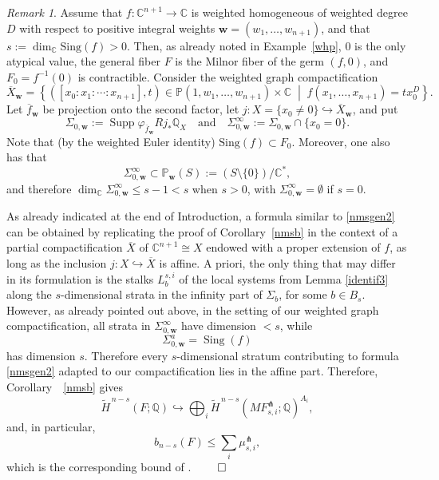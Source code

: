 \documentclass[12pt,leqno,twoside]{amsart}
\theoremstyle{remark}
\newtheorem{remark}[theorem]{\sc Remark}
\theoremstyle{remark}
\theoremstyle{definition}
\theoremstyle{remark}
\theoremstyle{remark}
\theoremstyle{remark}
\numberwithin{equation}{section}  %
\def\br{\begin{remark}}
\def\er{\end{remark}}
\newcommand{\bC}{\mathbb{C}}
\newcommand{\oX}{\overline{X}}
\newcommand{\Sing}{\mathrm{Sing}}
\begin{document}
\br\label{whp3}
Assume that $f\colon\bC^{n+1}\to \bC$ is weighted homogeneous of weighted degree $D$ with respect to positive integral weights $\mathbf w=(w_1,\ldots,w_{n+1})$, and that $s:=\dim_{\mathbb C}\Sing(f)>0$. Then, as already noted in Example~\ref{whp}, $0$ is the only atypical value, the general fiber $F$ is the Milnor fiber of the germ $(f,0)$, and $F_0=f^{-1}(0)$ is contractible.
Consider the weighted graph compactification
\[
\overline X_{\mathbf w}
=
\left\{
([x_0:x_1:\cdots:x_{n+1}],t)
\in\mathbb P(1,w_1,\ldots,w_{n+1})\times\mathbb C
\;\middle|\;
f(x_1,\ldots,x_{n+1})=t x_0^D
\right\}.
\]
Let \(\overline f_{\mathbf w}\) be projection onto the second factor,
let $j:X=\{x_0\neq0\}\hookrightarrow\overline X_{\mathbf w}$, and put
\[
\Sigma_{0,\mathbf w}
:=
\operatorname{Supp}
\varphi_{\overline f_{\mathbf w}}
Rj_*\mathbb Q_X
\quad \text{and} \quad 
\Sigma^\infty_{0,\mathbf w}
:=
\Sigma_{0,\mathbf w}\cap\{x_0=0\}.
\]
Note that (by the weighted Euler identity) $\Sing(f) \subset F_0$. Moreover, one also has that \[
\Sigma^\infty_{0,\mathbf w}
\subset
\mathbb P_{\mathbf w}(S)
:=
(S\setminus\{0\})/\mathbb C^*, 
\]
and therefore $\dim_{\mathbb C}\Sigma^\infty_{0,\mathbf w} \leq s-1<s$ when $s>0$, with $\Sigma^\infty_{0,\mathbf w}=\emptyset$ if $s=0$.

As already indicated at the end of Introduction, a formula similar to \eqref{nmsgen2} can be obtained by replicating the proof of Corollary~\ref{nmsb} in the context of a partial compactification $\oX$ of $\bC^{n+1}\cong X$ endowed with a proper extension of $f$, as long as the inclusion $j:X \hookrightarrow \oX$ is affine. A priori, the only thing that may differ in its formulation is the stalks ${L}_b^{s,i}$ of the local systems from Lemma \ref{identif3} along the $s$-dimensional strata in the infinity part of $\Sigma_b$, for some $b \in B_s$.
However, as already pointed out above, in the setting of our weighted graph compactification, all strata in $\Sigma^\infty_{0,\mathbf w}$ have dimension $<s$, while 
\[
\Sigma^a_{0,\mathbf w}=\operatorname{Sing}(f)
\]
has dimension $s$. Therefore every $s$-dimensional stratum
contributing to formula \eqref{nmsgen2} adapted to our compactification lies in the affine part. Therefore, Corollary~~\ref{nmsb} gives
\begin{equation}\label{lastf}
\widetilde H^{\,n-s}(F;\mathbb Q)
\hookrightarrow
\bigoplus_i
\widetilde H^{\,n-s}
   (MF^\pitchfork_{s,i};\mathbb Q)^{A_i},
\end{equation}
and, in particular,
\[
b_{n-s}(F)
\leq
\sum_i\mu^\pitchfork_{s,i},
\]
which is the corresponding bound of \cite[Thm.3.4(a)]{MPT2}. $\hfill\qed$
\er
\end{document}
